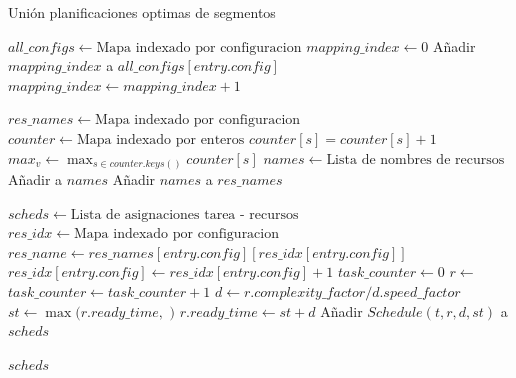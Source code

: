 \begin{algorithm}
\caption{Unión planificaciones optimas de segmentos}
\label{alg_blind_merge}
\begin{algorithmic}[1]
	\State $all\_configs \gets \text{Mapa indexado por configuracion}$
	\State $mapping\_index \gets 0$
        	\State Añadir $mapping\_index$ a $all\_configs[entry.config]$
        \EndFor
        \State $mapping\_index \gets mapping\_index + 1$
    \EndFor

    \State $res\_names \gets \text{Mapa indexado por configuracion}$
    	\State $counter \gets \text{Mapa indexado por enteros}$
			\State $counter[s] = counter[s] + 1$
    	\EndFor
    	\State ${max}_v \gets \max_{s \in counter.keys()} {counter[s]}$
    	\State $names \gets \text{Lista de nombres de recursos}$
    		\State Añadir  a $names$ 
    	\EndFor
    	\State Añadir $names$ a $res\_names$
    \EndFor

	\State $scheds \gets \text{Lista de asignaciones tarea - recursos}$
		\State $res\_idx \gets \text{Mapa indexado por configuracion}$
        	\State $res\_name \gets res\_names[ entry.config ] [ res\_idx[entry.config] ]$
        	\State $res\_idx[entry.config] \gets res\_idx[entry.config] + 1$
        	\State $task\_counter \gets 0$
        		\State $r \gets$ 
        		\State $task\_counter \gets task\_counter + 1$
        		\State $d \gets r.complexity\_factor / d.speed\_factor$
        		\State $st \gets \max(r.ready\_time,$ $)$
        		\State $r.ready\_time \gets st + d$
        		\State Añadir $Schedule(t, r, d, st)$ a $scheds$
        	\EndFor
        \EndFor
    \EndFor

    \State \Return $scheds$
\EndProcedure
\end{algorithmic}
\end{algorithm}

